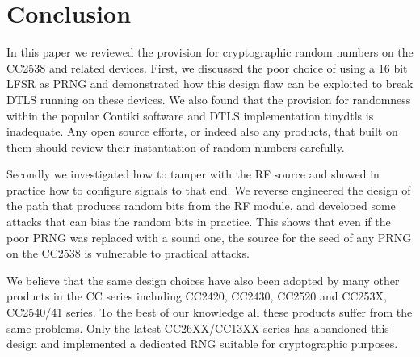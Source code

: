 \section{Conclusion}\label{Conclusion}
In this paper we reviewed the provision for cryptographic random numbers on the CC2538 and related devices. First, we discussed the poor choice of using a 16 bit LFSR as PRNG  and demonstrated how this design flaw can be exploited to break DTLS running on these devices. We also found that the provision for randomness within the popular Contiki software and DTLS implementation tinydtls is inadequate. Any open source efforts, or indeed also any products, that built on them should review their instantiation of random numbers carefully. 

Secondly we investigated how to tamper with the RF source and showed in practice how to configure signals to that end. We reverse engineered the design of the path that produces random bits from the RF module, and developed some attacks that can bias the random bits in practice. This shows that even if the poor PRNG was replaced with a sound one, the source for the seed of any PRNG on the CC2538 is vulnerable to practical attacks.

We believe that the same design choices have also been adopted by many other products in the CC series including CC2420\cite{CC2420Manual}, CC2430\cite{CC2430Manual}, CC2520\cite{CC2520Manual} and CC253X, CC2540/41 series\cite{CC2530Manual}. To the best of our knowledge all these products suffer from the same problems. Only the latest CC26XX/CC13XX\cite{CC26XXManual} series has abandoned this design and implemented a dedicated RNG suitable for cryptographic purposes.




